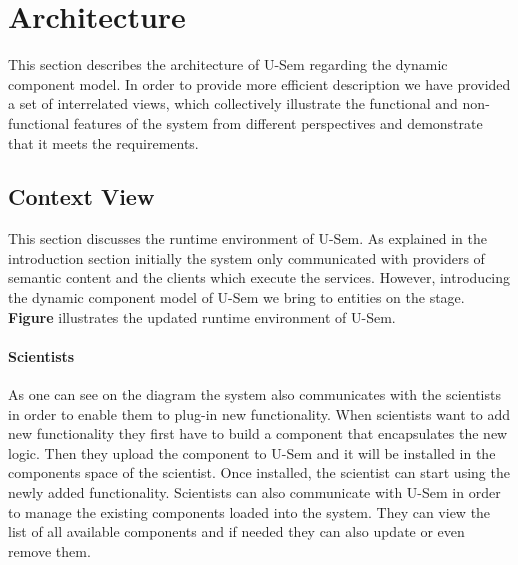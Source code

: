 \section{Architecture}

This section describes the architecture of U-Sem regarding the dynamic component model. In order to provide more efficient description we have provided a set of interrelated views, which collectively illustrate the functional and non-functional features of the system from different perspectives and demonstrate that it meets the requirements.

\subsection{Context View}

This section discusses the runtime environment of U-Sem. As explained in the introduction section initially the system only communicated with providers of semantic content and the clients which execute the services. However, introducing the dynamic component model of U-Sem we bring to entities on the stage. \textbf{Figure} illustrates the updated runtime environment of U-Sem.

\paragraph{Scientists}
As one can see on the diagram the system also communicates with the scientists in order to enable them to plug-in new functionality. When scientists want to add new functionality they first have to build a component that encapsulates the new logic. Then they upload the component to U-Sem and it will be installed in the components space of the scientist. Once installed, the scientist can start using the newly added functionality. Scientists can also communicate with U-Sem in order to manage the existing components loaded into the system. They can view the list of all available components and if needed they can also update or even remove them. 

